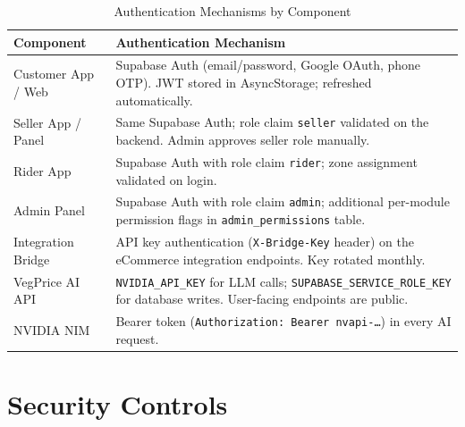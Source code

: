 \documentclass[12pt, a4paper, oneside]{report}
\begin{document}
\begin{table}[H]
\centering
\caption{Authentication Mechanisms by Component}
\label{tab:auth}
\begin{tabularx}{\textwidth}{@{} L{3.4cm} X @{}}
\toprule
\textbf{Component} & \textbf{Authentication Mechanism} \\
\midrule
Customer App / Web
  & Supabase Auth (email/password, Google OAuth, phone OTP). JWT stored
    in AsyncStorage; refreshed automatically. \\[4pt]
Seller App / Panel
  & Same Supabase Auth; role claim \texttt{seller} validated on the backend.
    Admin approves seller role manually. \\[4pt]
Rider App
  & Supabase Auth with role claim \texttt{rider}; zone assignment validated
    on login. \\[4pt]
Admin Panel
  & Supabase Auth with role claim \texttt{admin}; additional per-module
    permission flags in \texttt{admin\_permissions} table. \\[4pt]
Integration Bridge
  & API key authentication (\texttt{X-Bridge-Key} header) on the eCommerce
    integration endpoints. Key rotated monthly. \\[4pt]
VegPrice AI API
  & \texttt{NVIDIA\_API\_KEY} for LLM calls; \texttt{SUPABASE\_SERVICE\_ROLE\_KEY}
    for database writes. User-facing endpoints are public. \\[4pt]
NVIDIA NIM
  & Bearer token (\texttt{Authorization: Bearer nvapi-\ldots}) in every
    AI request. \\
\bottomrule
\end{tabularx}
\end{table}

\section{Security Controls}
\end{document}
